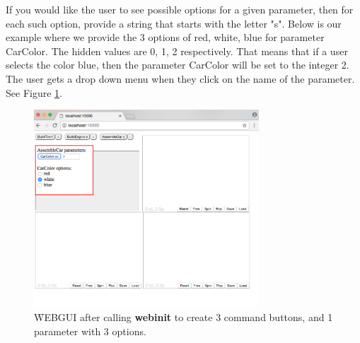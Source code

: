 If you would like the user to see possible options for a given parameter, then for each such option, provide a string that
starts with the letter "s". Below is our example where we provide the 3 options of red, white, blue for parameter
CarColor. The hidden values are 0, 1, 2 respectively. That means that if a user selects the color blue, then the parameter
CarColor will be set to the integer 2. The user gets a drop down menu when they click on the name of the parameter.
See Figure \ref{fig:12}.
\begin{figure}[H]
\centering
\includegraphics[width=0.75\textwidth]{pix/buttons3.png}
\caption{\f{WEBGUI} after calling \textbf{webinit} to create 3 command buttons, and 1 parameter with 3 options.}
\label{fig:12}
\end{figure} 
